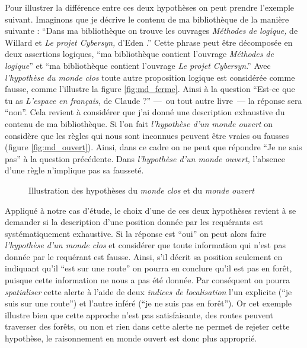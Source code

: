Pour illustrer la différence entre ces deux hypothèses on peut prendre
l'exemple suivant. Imaginons que je décrive le contenu de ma
bibliothèque de la manière suivante : \enquote{Dans ma bibliothèque on
  trouve les ouvrages \emph{Méthodes de logique,} de Willard
   et \emph{Le projet \emph{Cybersyn},} d'Eden
  .} Cette phrase peut être décomposée en deux assertions
logiques, \enquote{ma bibliothèque contient l'ouvrage \emph{Méthodes
    de logique}} et \enquote{ma bibliothèque contient l'ouvrage
  \emph{Le projet \emph{Cybersyn}}.} Avec \emph{l'hypothèse du monde
  clos} toute autre proposition logique est considérée comme fausse,
comme l'illustre la figure \ref{fig:md_ferme}. Ainsi à la question
\enquote{Est-ce que tu as \emph{L'espace en français,} de Claude
   ?} ---~ou tout autre livre~--- la réponse sera
\enquote{non}. Cela revient à considérer que j'ai donné une
description exhaustive du contenu de ma bibliothèque. Si l'on fait
\emph{l'hypothèse d'un monde ouvert} on considère que les règles qui
nous sont inconnues peuvent être vraies ou fausses (figure
\ref{fig:md_ouvert}). Ainsi, dans ce cadre on ne peut que répondre
\enquote{Je ne sais pas} à la question précédente. Dans
\emph{l'hypothèse d'un monde ouvert,} l’absence d'une règle n'implique
pas sa fausseté.

\begin{figure}
  \centering
  \subfloat[]{
    
    \label{fig:md_ferme}
  }\hspace{2cm}
  \subfloat[]{
    
    \label{fig:md_ouvert}
  }
  \caption{Illustration des hypothèses du \emph{monde clos}
    \protect{} et du \emph{monde ouvert}
    \protect{}}
  \label{fig:comp_md}
\end{figure}

Appliqué à notre cas d'étude, le choix d'une de ces deux hypothèses
revient à se demander si la description d'une position donnée par les
requérants est systématiquement exhaustive. Si la réponse est
\enquote{oui} on peut alors faire \emph{l'hypothèse d'un monde clos}
et considérer que toute information qui n'est pas donnée par le
requérant est fausse. Ainsi, s'il décrit sa position seulement en
indiquant qu'il \enquote{est sur une route} on pourra en conclure
qu'il est pas en forêt, puisque cette information ne nous a pas été
donnée. Par conséquent on pourra \emph{spatialiser} cette alerte à
l'aide de deux \emph{indices de localisation} l'un explicite
(\enquote{je suis sur une route}) et l'autre inféré (\enquote{je ne
  suis pas en forêt}). Or cet exemple illustre bien que cette approche
n'est pas satisfaisante, des routes peuvent traverser des forêts, ou
non et rien dans cette alerte ne permet de rejeter cette hypothèse, le
raisonnement en monde ouvert est donc plus approprié.

